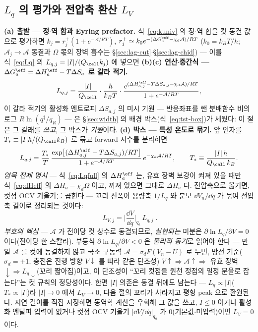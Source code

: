 \subsection{$L_q$ 의 평가와 전압축 환산 $L_V$}\label{sec:lag-LV}
\textbf{(a) 출발 --- 정$\cdot$역 합과 Eyring prefactor.} 식~\eqref{eq:kuniv} 의 정$\cdot$역 합을 컷 동결
값으로 평가하면 $k_j=r_j^+(1+e^{-\mathcal A/RT})$, $r_j^+\simeq k_0e^{-(\Delta G_a^\eff-\chi_d\mathcal A)/RT}$
($k_0=k_BT/h$; $\mathcal A_j\to\mathcal A$ 동결과 $\Omega$ 몫의 장벽 흡수는 \S\ref{sec:lag-cut}$\cdot$\S\ref{sec:lag-chid})
--- 이를 식~\eqref{eq:Lq} 의 $L_{q,j}=|I|/(Q_\cell k_j)$
에 넣으면 \textbf{(b)(c) 연산$\cdot$중간식 --- $\Delta G_a^\eff=\Delta H_a^\eff-T\Delta S_a$ 로 갈라 적기.}
\begin{equation}
L_{q,j}=\frac{|I|}{Q_\cell}\cdot\frac{h}{k_BT}\cdot
\frac{e^{(\Delta H_{a,j}^\eff-T\Delta S_{a,j}-\chi_d\mathcal A)/RT}}{1+e^{-\mathcal A/RT}},
\label{eq:Lqmid2}
\end{equation}
이 갈라 적기의 활성화 엔트로피 $\Delta S_{a,j}$ 의 미시 기원 --- 반응좌표를 뺀 분배함수 비의 로그
$R\ln(q^{\ddagger}/q_R)$ --- 은 \S\ref{sec:width} 의 배경 박스(식~\eqref{eq:tst-box})가 세웠다: 이 절은 그
갈래를 \emph{쓰고}, 그 박스가 \emph{기원}이다.
\textbf{(d) 박스 --- 특성 온도로 묶기.} 앞 인자를 $T_*\equiv|I|h/(Q_\cell k_B)$ 로 묶고 forward 지수를 분리하면
\begin{equation}
L_{q,j}=\frac{T_*}{T}\,\frac{\exp\!\big[(\Delta H_{a,j}^\eff-T\Delta S_{a,j})/RT\big]}{1+e^{-\mathcal A/RT}}
\,e^{-\chi_d\mathcal A/RT},
\qquad T_*\equiv\frac{|I|\,h}{Q_\cell\,k_B}.
\label{eq:Lqfull}
\end{equation}
\emph{암묵 전제 명시} --- 식~\eqref{eq:Lqfull} 의
$\Delta H_a^\eff$ 는, 유효 장벽 보강이 켜져 있을 때만 식~\eqref{eq:dHeff} 의 $\Delta H_a-\chi_d\Omega$ 이고,
꺼져 있으면 그대로 $\Delta H_a$ 다. 전압축으로 옮기면, 컷점 OCV 기울기를 곱한다 --- 꼬리 진폭이
용량축 $1/L_q$ 와 분모 $\dd V_n/\dd q$ 가 묶여 전압축 길이로 정리되는 것이다:
\begin{equation}
\boxed{\;L_{V,j}=\Big|\frac{\dd V}{\dd q}\Big|_{q_a}\,L_{q,j}\;.}
\label{eq:LV}
\end{equation}
\emph{부호의 핵심} --- $\mathcal A$ 가 전이당 컷 상수로 동결되므로, \emph{실현되는} 미분은
$\partial\ln L_q/\partial V=0$ 이다(전이당 한 스칼라). 부등식 $\partial\ln L_q/\partial V<0$ 은 \emph{물리적 동기}로 읽어야
한다 --- 만일 $\mathcal A$ 를 컷에 동결하지 않고 국소 구동력 $\mathcal A=\sigma_dF(V_n-U)$ 로 두면, 방전
기준($\sigma_d=+1$; 충전은 진행 방향 $V\!\downarrow$ 를 따라 같은 단조성) $V\!\uparrow\Rightarrow
\mathcal A\!\uparrow\Rightarrow$ 유효 장벽$\downarrow\Rightarrow L_q\downarrow$(꼬리 짧아짐)이고, 이 단조성이 ``꼬리 컷점을
원천 정점의 일정 분율로 잡는다''는 컷 규칙의 정당성이다. 한편 $|I|$ 의존은 동결 뒤에도 남는다 --- $L_q\propto|I|$($T_*\propto|I|$)라 $|I|\to0$
에서 $L_V\to0$, 다음 절의 꼬리가 사라지고 평형 peak 으로 환원된다. 지연 길이를 직접 지정하면 동역학 계산을 우회해
그 값을 쓰고, $I\le0$ 이거나 활성화 엔탈피 입력이 없거나 컷점 OCV 기울기 $|\dd V/\dd q|_{q_a}$ 가
$0$(기본값$\cdot$미입력)이면 $L_V=0$ 이다.

